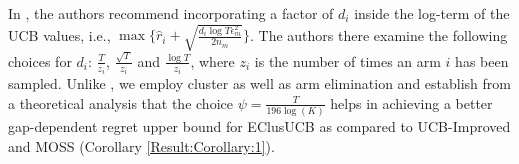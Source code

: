 In \citet{liu2016modification}, the authors recommend incorporating a factor of $d_i$ inside the log-term of the UCB values, i.e., $\max \lbrace\hat{r}_{i}+\sqrt{\frac{d_{i}\log T{\epsilon}_{m}^{2}}{2n_{m}}}\rbrace$. 
The authors there examine the following choices for $d_i$: $\frac{T}{z_{i}}$, $\frac{\sqrt{T}}{z_{i}}$ and $\frac{\log T}{z_{i}}$, where $z_{i}$ is the number of times an arm ${i}$ has been sampled.
Unlike \citet{liu2016modification}, we employ cluster as well as arm elimination and establish from a theoretical analysis that the choice $\psi=\frac{T}{196\log (K)}$ helps in achieving a better gap-dependent regret upper bound for EClusUCB as compared to UCB-Improved and MOSS (Corollary \ref{Result:Corollary:1}). 

